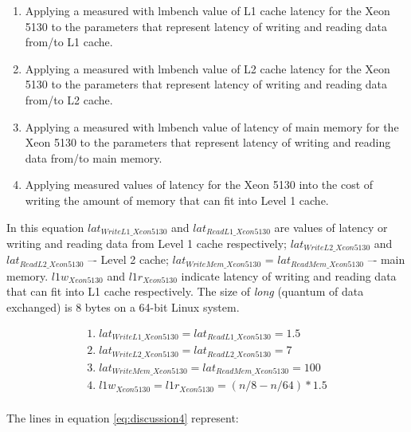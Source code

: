 \begin{enumerate}
  \item Applying a measured with lmbench value of L1 cache latency for the Xeon 5130 to the parameters that represent latency of writing and reading data from/to L1 cache.
  \item Applying a measured with lmbench value of L2 cache latency for the Xeon 5130 to the parameters that represent latency of writing and reading data from/to L2 cache.
  \item Applying a measured with lmbench value of latency of main memory for the Xeon 5130 to the parameters that represent latency of writing and reading data from/to main memory.
  \item Applying measured values of latency for the Xeon 5130 into the cost of writing the amount of memory that can fit into Level 1 cache.
\end{enumerate}

In this equation $lat_{WriteL1\_Xeon5130}$ and $lat_{ReadL1\_Xeon5130}$ are values of latency or writing and reading data from Level 1 cache respectively; $lat_{WriteL2\_Xeon5130}$ and $lat_{ReadL2\_Xeon5130}$ –- Level 2 cache; $lat_{WriteMem\_Xeon5130}$ = $lat_{ReadMem\_Xeon5130}$ –- main memory. $l1w_{Xeon5130}$ and $l1r_{Xeon5130}$ indicate latency of writing and reading data that can fit into L1 cache respectively. The size of \textit{long} (quantum of data exchanged) is 8 bytes on a 64-bit Linux system.

\begin{equation}\label{eq:discussion3}
\begin{split}
1.\; lat_{WriteL1\_Xeon5130} = lat_{ReadL1\_Xeon5130} = 1.5 \\
2.\; lat_{WriteL2\_Xeon5130} = lat_{ReadL2\_Xeon5130} = 7 \\
3.\; lat_{WriteMem\_Xeon5130} = lat_{ReadMem\_Xeon5130} = 100 \\
4.\; l1w_{Xeon5130} = l1r_{Xeon5130} = (n/8 - n/64) * 1.5 \\ 
\end{split}
\end{equation}

The lines in equation \ref{eq:discussion4} represent:

